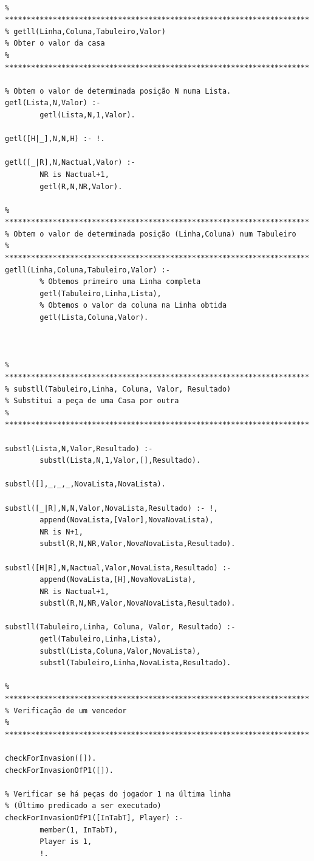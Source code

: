 \documentclass[15pt,a4paper]{article}
\begin{document}
\begin{lstlisting}
        
% **********************************************************************
% getll(Linha,Coluna,Tabuleiro,Valor)
% Obter o valor da casa
% **********************************************************************

% Obtem o valor de determinada posição N numa Lista.
getl(Lista,N,Valor) :-
		getl(Lista,N,1,Valor).

getl([H|_],N,N,H) :- !.

getl([_|R],N,Nactual,Valor) :-
		NR is Nactual+1,
		getl(R,N,NR,Valor).

% **********************************************************************
% Obtem o valor de determinada posição (Linha,Coluna) num Tabuleiro
% **********************************************************************
getll(Linha,Coluna,Tabuleiro,Valor) :-
		% Obtemos primeiro uma Linha completa
		getl(Tabuleiro,Linha,Lista),
		% Obtemos o valor da coluna na Linha obtida
		getl(Lista,Coluna,Valor).

                 
                 
% **********************************************************************
% substll(Tabuleiro,Linha, Coluna, Valor, Resultado)
% Substitui a peça de uma Casa por outra
% **********************************************************************

substl(Lista,N,Valor,Resultado) :-
        substl(Lista,N,1,Valor,[],Resultado).

substl([],_,_,_,NovaLista,NovaLista).

substl([_|R],N,N,Valor,NovaLista,Resultado) :- !,
		append(NovaLista,[Valor],NovaNovaLista),
		NR is N+1,
		substl(R,N,NR,Valor,NovaNovaLista,Resultado).

substl([H|R],N,Nactual,Valor,NovaLista,Resultado) :-
		append(NovaLista,[H],NovaNovaLista),
		NR is Nactual+1,
		substl(R,N,NR,Valor,NovaNovaLista,Resultado).

substll(Tabuleiro,Linha, Coluna, Valor, Resultado) :-
		getl(Tabuleiro,Linha,Lista),
		substl(Lista,Coluna,Valor,NovaLista),
		substl(Tabuleiro,Linha,NovaLista,Resultado).

% **********************************************************************
% Verificação de um vencedor
% **********************************************************************

checkForInvasion([]).
checkForInvasionOfP1([]).

% Verificar se há peças do jogador 1 na última linha
% (Último predicado a ser executado)
checkForInvasionOfP1([InTabT], Player) :-
		member(1, InTabT),
		Player is 1,
		!.


\end{lstlisting}
\end{document}
